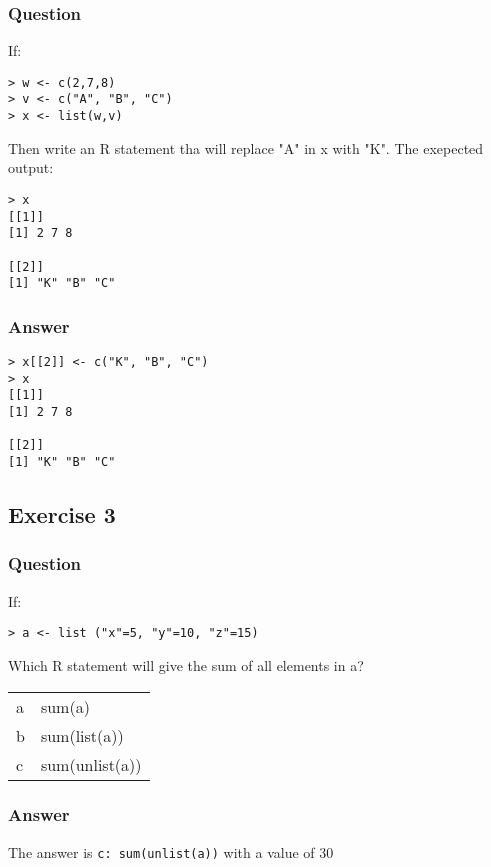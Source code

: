 \documentclass[11pt]{article}
\begin{document}
\subsubsection{Question}
\label{sec:org1924a75}
If:
\begin{verbatim}
> w <- c(2,7,8)
> v <- c("A", "B", "C")
> x <- list(w,v)
\end{verbatim}

Then write an R statement tha will replace "A" in x with "K". The exepected output:
\begin{verbatim}
> x
[[1]]
[1] 2 7 8

[[2]]
[1] "K" "B" "C"
\end{verbatim}

\subsubsection{Answer}
\label{sec:org6edf46c}
\begin{verbatim}
> x[[2]] <- c("K", "B", "C")
> x
[[1]]
[1] 2 7 8

[[2]]
[1] "K" "B" "C"
\end{verbatim}

\subsection{Exercise 3}
\label{sec:orgdc283b3}
\subsubsection{Question}
\label{sec:orgf72e5fc}
If:
\begin{verbatim}
> a <- list ("x"=5, "y"=10, "z"=15)
\end{verbatim}

Which R statement will give the sum of all elements in a?
\begin{center}
\begin{tabular}{ll}
a & sum(a)\\
b & sum(list(a))\\
c & sum(unlist(a))\\
\end{tabular}
\end{center}

\subsubsection{Answer}
\label{sec:orgec54415}
The answer is \texttt{c: sum(unlist(a))} with a value of 30
\end{document}
